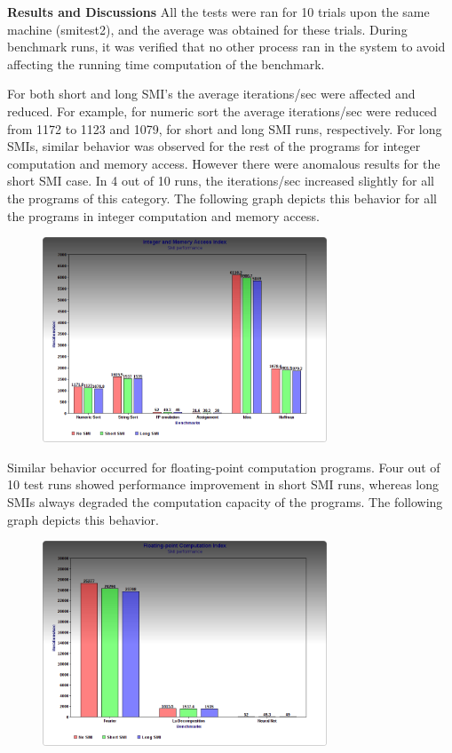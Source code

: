 \documentclass{IEEEtran}
\begin{document}
\textbf{Results and Discussions}
All the tests were ran for 10 trials upon the same machine (smitest2), and the average was obtained for these trials. During benchmark runs, it was verified that no other process ran in the system to avoid affecting the running time computation of the benchmark. 

For both short and long SMI's the average iterations/sec were affected and reduced. For example, for numeric sort the average iterations/sec were reduced from 1172 to 1123 and 1079, for short and long SMI runs, respectively. For long SMIs, similar behavior was observed for the rest of the programs for integer computation and memory access. However there were anomalous results for the short SMI case. In 4 out of 10 runs, the iterations/sec increased slightly for all the programs of this category. The following graph depicts this behavior for all the programs in integer computation and memory access. 

\begin{figure}[H]
\includegraphics[keepaspectratio=true,width=240pt]{vj_graph1.png}
\caption{ }
\end{figure}

Similar behavior occurred for floating-point computation programs. Four out of 10 test runs showed performance improvement in short SMI runs, whereas long SMIs always degraded the computation capacity of the programs. The following graph depicts this behavior.

\begin{figure}[H]
\includegraphics[keepaspectratio=true,width=240pt]{vj_graph2.png}
\caption{ }
\end{figure}
\end{document}
